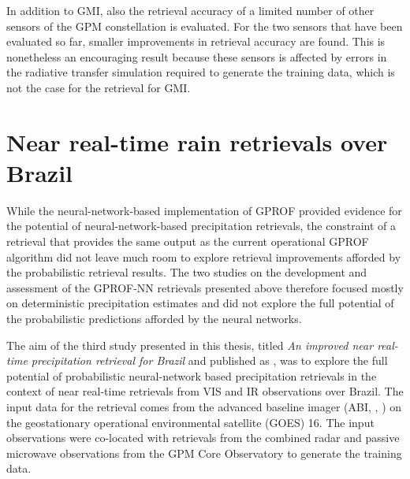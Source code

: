 In addition to GMI, also the retrieval accuracy of a limited number of other
sensors of the GPM constellation is evaluated. For the two sensors that have
been evaluated so far, smaller improvements in retrieval accuracy are found.
This is nonetheless an encouraging result because these sensors is affected by
errors in the radiative transfer simulation required to generate the training
data, which is not the case for the retrieval for GMI.

\section{Near real-time rain retrievals over Brazil}

While the neural-network-based implementation of GPROF provided  evidence
for the potential of neural-network-based precipitation retrievals, the
constraint of a retrieval that provides the same output as the current
operational GPROF algorithm did not leave much room to explore retrieval
improvements afforded by the probabilistic retrieval results. The two studies on
the development and assessment of the GPROF-NN retrievals presented above
therefore focused mostly on deterministic precipitation estimates and did not
explore the full potential of the probabilistic predictions afforded by the
neural networks.

The aim of the third study presented in this thesis, titled \textit{%
  An
  improved near real-time precipitation retrieval for Brazil%
} and published as
  \citet{pfreundschuh22b}, was to explore the full potential of probabilistic
  neural-network based precipitation retrievals in the context of near real-time
  retrievals from VIS and IR observations over Brazil. The input data for the
  retrieval comes from the advanced baseline imager (ABI, \citeauthor{schmit18},
  \citeyear{schmit18}) on the geostationary operational environmental satellite
  (GOES) 16. The input observations were co-located with
  retrievals from the combined radar and passive microwave observations
  from the GPM Core Observatory to generate the training data.


